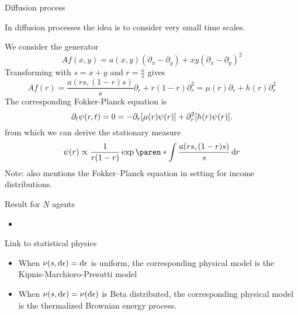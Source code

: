 \documentclass[9pt, handout]{beamer}
\begin{document}
\begin{frame}{Diffusion process}

In diffusion processes the idea is to consider very small time scales.

We consider the generator
\[
Af(x, y) = a(x, y)(\partial_x - \partial_y) + xy (\partial_x - \partial_y)^2
\]
Transforming with $s = x+y$ and $r = \frac{x}{s}$ gives
\[
Af(r)
= \frac{a(rs, (1-r)s)}{s}\partial_r + r(1-r) \partial_r^2
= \mu(r)\partial_r + h(r) \partial_r^2
\]
\pause
The corresponding Fokker-Planck equation is
\[
\partial_t \psi(r, t) = 0 =
- \partial_r[\mu(r) \psi(r)] + \partial_r^2[h(r) \psi(r)].
\]
from which we can derive the stationary measure
\[
\psi(r) \propto \frac{1}{r(1-r)}\exp\paren*{\int\frac{a(rs, (1-r)s)}{s} \diff r} %
\]
Note:  also mentions the Fokker--Planck equation in setting for income distributions.
\end{frame}




\begin{frame}{Result for $N$ agents}
\begin{itemize}
    \item
\end{itemize}
\end{frame}




\begin{frame}{Link to statistical physics}
\begin{itemize}
    \item When $\nu(s, \mathop{}\!\mathrm{d} \epsilon) = \mathop{}\!\mathrm{d}\epsilon$ is uniform, the corresponding physical model is the Kipnis-Marchioro-Presutti model
    \item When $\nu(s, \mathop{}\!\mathrm{d} \epsilon) = \nu(\mathop{}\!\mathrm{d}\epsilon)$ is Beta distributed, the corresponding physical model is the thermalized Brownian energy process.
\end{itemize}
\end{frame}
\end{document}
